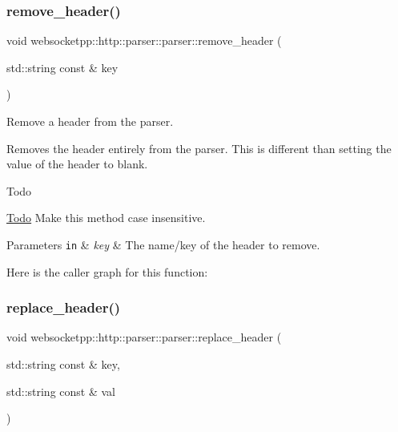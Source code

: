 \subsubsection{\texorpdfstring{remove\+\_\+header()}{remove\_header()}}
{\footnotesize\ttfamily void websocketpp\+::http\+::parser\+::parser\+::remove\+\_\+header (\begin{DoxyParamCaption}\item[{std\+::string const \&}]{key }\end{DoxyParamCaption})\hspace{0.3cm}{\ttfamily [inline]}}



Remove a header from the parser. 

Removes the header entirely from the parser. This is different than setting the value of the header to blank.

\begin{DoxyRefDesc}{Todo}
\item[\mbox{\hyperlink{todo__todo000019}{Todo}}]Make this method case insensitive.\end{DoxyRefDesc}



\begin{DoxyParams}[1]{Parameters}
\mbox{\tt in}  & {\em key} & The name/key of the header to remove. \\
\hline
\end{DoxyParams}
Here is the caller graph for this function\+:
\mbox{\label{classwebsocketpp_1_1http_1_1parser_1_1parser_aba2991b2aa41ca60d9427950502b0b93}} 
\subsubsection{\texorpdfstring{replace\+\_\+header()}{replace\_header()}}
{\footnotesize\ttfamily void websocketpp\+::http\+::parser\+::parser\+::replace\+\_\+header (\begin{DoxyParamCaption}\item[{std\+::string const \&}]{key,  }\item[{std\+::string const \&}]{val }\end{DoxyParamCaption})\hspace{0.3cm}{\ttfamily [inline]}}



